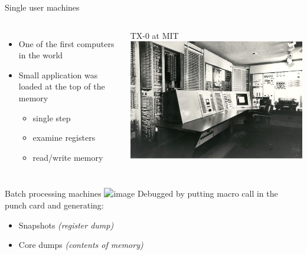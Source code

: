 \documentclass{beamer} %
\begin{document}
\begin{frame}{Single user machines}

\begin{columns}
\begin{itemize}
    \item One of the first computers in the world
    \item Small application was loaded at the top of the memory
      \begin{itemize}
          \item single step
          \item examine registers
          \item read/write memory
      \end{itemize}
\end{itemize}

\begin{block}{TX-0 at MIT}
\includegraphics[width=0.4\paperwidth]{tx0.jpg}
\end{block}

\end{columns}


\end{frame}

\begin{frame}{Batch processing machines}
\includegraphics<1>[width=\textwidth]{punch_card_stack.jpg}
\pause
Debugged by putting macro call in the punch card and generating:
\begin{itemize}
    \item Snapshots \textit{(register dump)}
    \item Core dumps \textit{(contents of memory)}
\end{itemize}


\end{frame}
\end{document}
